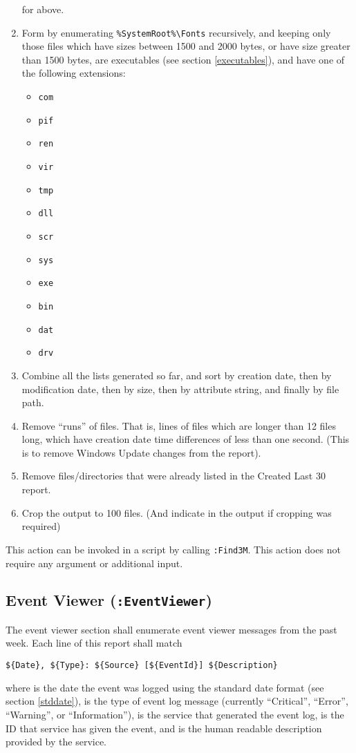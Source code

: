 \begin{enumerate}
    for  above.
    \item Form  by enumerating \verb|%SystemRoot%\Fonts| recursively,
    and keeping only those files which have sizes between 1500 and 2000 bytes,
    or have size greater than 1500 bytes, are executables (see section
    \ref{executables}), and have one of the following extensions:
    \begin{itemize}
        \item \verb|com|
        \item \verb|pif|
        \item \verb|ren|
        \item \verb|vir|
        \item \verb|tmp|
        \item \verb|dll|
        \item \verb|scr|
        \item \verb|sys|
        \item \verb|exe|
        \item \verb|bin|
        \item \verb|dat|
        \item \verb|drv|
    \end{itemize}
    \item Combine all the lists generated so far, and sort by creation date,
    then by modification date, then by size, then by attribute string, and
    finally by file path.
    \item Remove ``runs'' of files. That is, lines of files which are longer
    than 12 files long, which have creation date time differences of less than
    one second. (This is to remove Windows Update changes from the report).
    \item Remove files/directories that were already listed in the Created Last
    30 report.
    \item Crop the output to 100 files. (And indicate in the output if cropping
    was required)
\end{enumerate}

This action can be invoked in a script by calling \verb|:Find3M|.
This action does not require any argument or additional input.

\subsection{Event Viewer (\texttt{:EventViewer})}
The event viewer section shall enumerate event viewer messages from the past
week. Each line of this report shall match
\begin{verbatim}
${Date}, ${Type}: ${Source} [${EventId}] ${Description}
\end{verbatim}
where  is the date the event was logged using the standard date format
(see section \ref{stddate}),  is the type of event log message
(currently ``Critical'', ``Error'', ``Warning'', or ``Information''),
 is the service that generated the event log,  is the
ID that service has given the event, and  is the human readable
description provided by the service.


